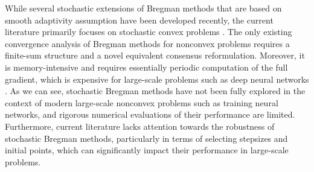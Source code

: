 \documentclass[twoside,11pt]{article}
\begin{document}
While several stochastic extensions of Bregman methods that are based on smooth adaptivity assumption have been developed recently, the current literature primarily focuses on stochastic convex problems \citep{dragomir2021fast,hanzely2021fastest,lu2019relative}. The only existing convergence analysis of Bregman methods for nonconvex problems \citep{latafat2022bregman} requires a finite-sum structure and a novel equivalent consensus reformulation. Moreover, it is memory-intensive and requires essentially periodic computation of the full gradient, which is %
{expensive}
for large-scale problems such as deep neural networks \citep{defazio2019ineffectiveness}.
As we can see, stochastic Bregman methods have not been fully explored in the context of modern large-scale nonconvex problems such as training neural networks, and {rigorous numerical evaluations} of their performance are limited. Furthermore, current literature lacks attention towards the robustness of stochastic Bregman methods, particularly in terms of selecting stepsizes and initial points, which can significantly impact their performance in large-scale problems.  
\end{document}
